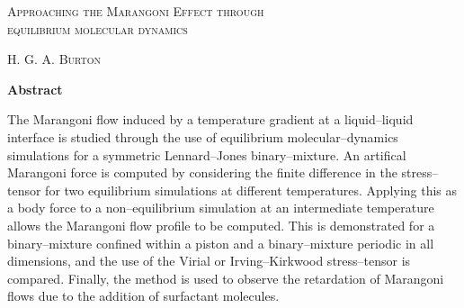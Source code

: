 \thispagestyle{plain}
\begin{center}
\textsc{\Large Approaching the Marangoni Effect through\\ equilibrium molecular dynamics}

    \vspace{0.2cm}
    \normalsize{{\textsc{H. G. A. Burton}}}
    
\vspace{0.2cm}
    \normalsize{\textbf{Abstract}}
\end{center}
The Marangoni flow induced by a temperature gradient at a liquid--liquid interface is studied through the use of equilibrium molecular--dynamics simulations for a symmetric Lennard--Jones binary--mixture.
An artifical Marangoni force is computed by considering the finite difference in the stress--tensor for two equilibrium simulations at different temperatures.
Applying this as a body force to a non--equilibrium simulation at an intermediate temperature allows the Marangoni flow profile to be computed.
This is demonstrated for a binary--mixture confined within a piston and a binary--mixture periodic in all dimensions, and the use of the Virial or Irving--Kirkwood stress--tensor is compared.
Finally, the method is used to observe the retardation of Marangoni flows due to the addition of surfactant molecules.

